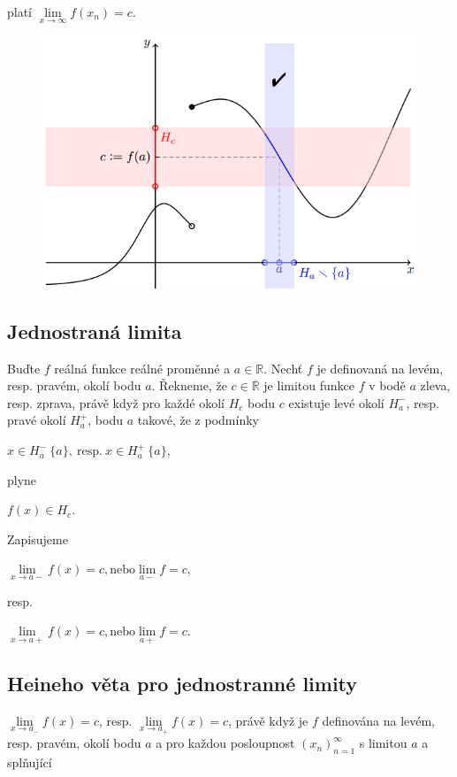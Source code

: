 \documentclass{szzclass}
\begin{document}
platí  
$\lim\limits_{x \rightarrow \infty} f(x_n) = c$.

\begin{figure}[h]
    \includegraphics[width=.6\textwidth, center]{topics/bi-spol-34/images/nor_lim.png}
\end{figure}

\newpage

\subsection{Jednostraná limita}
Buďte $f$ reálná funkce reálné proměnné a $a \in \mathbb{R}$.
Nechť $f$ je definovaná na levém, resp. pravém, okolí bodu $a$.
Řekneme, že $c\in\overline{\mathbb{R}}$ je limitou funkce 
$f$ v bodě $a$ zleva, resp. zprava, právě když pro každé okolí 
$H_c$ bodu $c$ existuje levé okolí $H^−_a$, resp. pravé okolí 
$H^+_a$, bodu $a$ takové, že z podmínky 

\begin{center}
$x \in H^-_a \ \{a\}, \ \text{resp.} \ x \in H^+_a \ \{a\}$,
\end{center}
plyne
\begin{center}
$f(x) \in H_c$.
\end{center}
Zapisujeme
\begin{center}
$\lim\limits_{x\to a-} f(x) = c, \text{nebo} \lim\limits_{a-} f = c$,
\end{center}
resp.
\begin{center}
$\lim\limits_{x\to a+} f(x) = c, \text{nebo} \lim\limits_{a+} f = c$.
\end{center}

\subsection{Heineho věta pro jednostranné limity}
$\lim\limits_{x \rightarrow a_-} f(x) = c$, resp. 
$\lim\limits_{x \rightarrow a_+} f(x) = c$,
právě když je $f$ definována na levém, resp. 
pravém, okolí bodu $a$ a pro každou posloupnost 
$(x_n)_{n=1}^\infty$ s limitou $a$ a splňující
\end{document}
